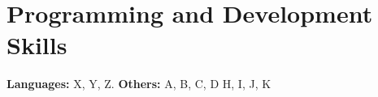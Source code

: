 \section{Programming and Development Skills}
\textbf{Languages:} X, Y, Z. \linebreak
\textbf{Others:} A, B, C, D
H, I, J, K
